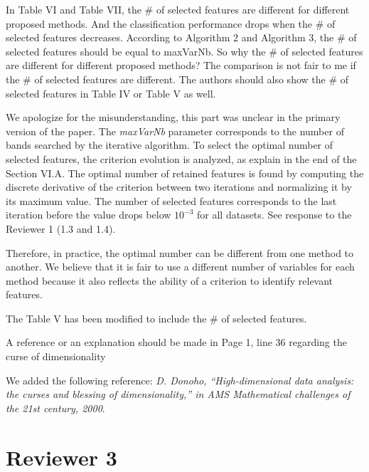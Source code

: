 \documentclass[a4paper,10pt,DIV=16]{scrartcl}
\begin{document}
\begin{revbox}
  In Table VI and Table VII, the \# of selected features are different for different proposed methods. And the classification performance drops when the \# of selected features decreases. According to Algorithm 2 and Algorithm 3, the \# of selected features should be equal to maxVarNb. So why the \# of selected features are different for different proposed methods? The comparison is not fair to me if the \# of selected features are different. The authors should also show the \# of selected features in Table IV or Table V as well.
  \begin{resbox}
    We apologize  for the misunderstanding,  this part was  unclear in
    the primary  version of  the paper. The  \emph{maxVarNb} parameter
    corresponds  to  the number  of  bands  searched by  the  iterative
    algorithm. To select  the optimal number of  selected features, the
    criterion  evolution is  analyzed, as  explain in  the end  of the
    Section VI.A. The optimal number  of retained features is found by
    computing  the discrete  derivative  of the  criterion between  two
    iterations and normalizing it by  its maximum value. The number of
    selected  features corresponds  to the  last iteration  before the
    value drops below $10^{-3}$ for  all datasets. See response to the
    Reviewer 1 (1.3 and 1.4).

    Therefore, in practice, the optimal number can be different from one method to another.  We believe that it is fair to use a different number of variables for each method because it also reflects the ability of a criterion to identify relevant features.

    The Table V has been modified to include the \# of selected features.
  \end{resbox}
\end{revbox}

\begin{revbox}
  A reference or an explanation should be made in Page 1, line 36 regarding the curse of dimensionality
  \begin{resbox}
    We added the following reference: \emph{D. Donoho, ``High-dimensional data analysis: the curses and blessing of dimensionality,'' in AMS Mathematical challenges of the 21st century, 2000}.
  \end{resbox}
\end{revbox}

\section{Reviewer 3}
\end{document}
